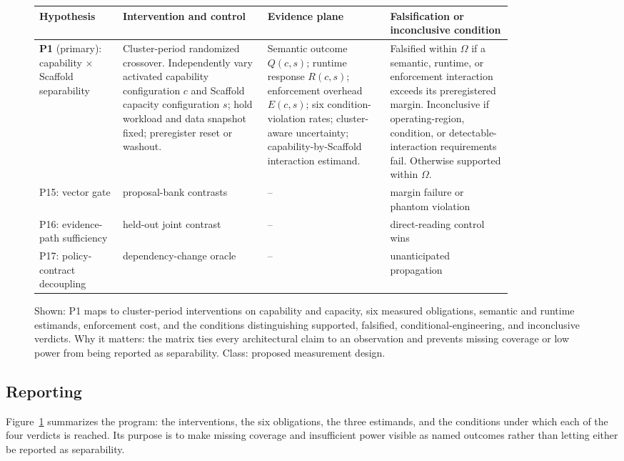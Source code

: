 \documentclass[11pt]{article}
\begin{document}
\begin{figure}[t]
\centering
\renewcommand{\arraystretch}{1.25}
\small
\begin{tabular}{p{0.15\linewidth}p{0.26\linewidth}p{0.22\linewidth}p{0.22\linewidth}}
\hline
\textbf{Hypothesis} & \textbf{Intervention and control} & \textbf{Evidence plane} & \textbf{Falsification or inconclusive condition} \\
\hline
\textbf{P1} (primary): capability $\times$ Scaffold separability &
Cluster-period randomized crossover. Independently vary activated capability configuration $c$ and Scaffold capacity configuration $s$; hold workload and data snapshot fixed; preregister reset or washout. &
Semantic outcome $Q(c,s)$; runtime response $R(c,s)$; enforcement overhead $E(c,s)$; six condition-violation rates; cluster-aware uncertainty; capability-by-Scaffold interaction estimand. &
Falsified within $\Omega$ if a semantic, runtime, or enforcement interaction exceeds its preregistered margin. Inconclusive if operating-region, condition, or detectable-interaction requirements fail. Otherwise supported within $\Omega$. \\
\hline
P15: vector gate & proposal-bank contrasts & -- & margin failure or phantom violation \\
P16: evidence-path sufficiency & held-out joint contrast & -- & direct-reading control wins \\
P17: policy-contract decoupling & dependency-change oracle & -- & unanticipated propagation \\
\hline
\end{tabular}
\caption{Shown: P1 maps to cluster-period interventions on capability and capacity, six measured obligations, semantic and runtime estimands, enforcement cost, and the conditions distinguishing supported, falsified, conditional-engineering, and inconclusive verdicts. Why it matters: the matrix ties every architectural claim to an observation and prevents missing coverage or low power from being reported as separability. Class: proposed measurement design.}
\label{fig:evaluation-matrix}
\end{figure}

\subsection{Reporting}

Figure~\ref{fig:evaluation-matrix} summarizes the program: the interventions, the six obligations, the three estimands, and the conditions under which each of the four verdicts is reached. Its purpose is to make missing coverage and insufficient power visible as named outcomes rather than letting either be reported as separability.
\end{document}

